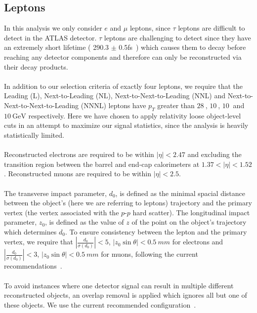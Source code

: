\subsection{Leptons}
\label{sec:lepton-object}
In this analysis we only consider $e$ and $\mu$ leptons, since $\tau$ leptons are difficult to detect in the ATLAS detector. $\tau$ leptons are challenging to detect since they have an extremely short lifetime ( 290.3 $\pm$ 0.5fs~\cite{pdg}) which causes them to decay before reaching any detector components and therefore can only be reconstructed via their decay products.\\\\

In addition to our selection criteria of exactly four leptons, we require that the Leading (L), Next-to-Leading (NL), Next-to-Next-to-Leading (NNL) and Next-to-Next-to-Next-to-Leading (NNNL) leptons have $p_{T}$ greater than $\SI{28}{}$, $\SI{10}{}$, $\SI{10}{}$ and $\SI{10}{\GeV}$ respectively. Here we have chosen to apply relativity loose object-level cuts in an attempt to maximize our signal statistics, since the analysis is heavily statistically limited.\\\\

Reconstructed electrons are required to be within $|\eta| < 2.47$ and excluding the transition region between the barrel and end-cap calorimeters at $1.37 < |\eta| < 1.52$. Reconstructed muons are required to be within $|\eta| < 2.5$.\\\\

The transverse impact parameter, $d_{0}$, is defined as the minimal spacial distance between the object's (here we are referring to leptons) trajectory and the primary vertex (the vertex associated with the $p$-$p$ hard scatter). The longitudinal impact parameter, $z_{0}$, is defined as the value of $z$ of the point on the object's trajectory which determines $d_{0}$. To ensure consistency between the lepton and the primary vertex, we require that $|\frac{d_{0}}{\sigma(d_{0})}| < 5$, $|z_{0}\sin{\theta}| < \SI{0.5}{mm}$ for electrons and $|\frac{d_{0}}{\sigma(d_{0})}| < 3$, $|z_{0}\sin{\theta}| < \SI{0.5}{mm}$ for muons, following the current recommendations~\cite{TopRecoObjTwikiModel}.\\\\

To avoid instances where one detector signal can result in multiple different reconstructed objects, an overlap removal is applied which ignores all but one of these objects. We use the current recommended configuration~\cite{Overlap-removal-slides}.\\\\

